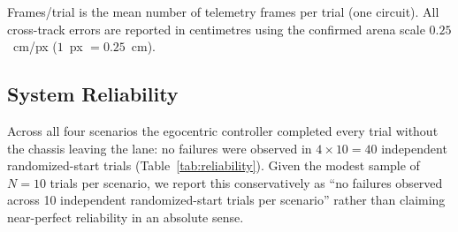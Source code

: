 \begin{table}[H]
\centering
\caption{Kinematic Performance Summary of the Final Egocentric Model, pooled over $N=10$ independent randomized-start trials per scenario.}
\label{tab:4.2}
\footnotesize
{}

\vspace{2pt}
{\footnotesize Frames/trial is the mean number of telemetry frames per trial (one circuit). All cross-track errors are reported in centimetres using the confirmed arena scale $0.25$~cm/px ($1$~px $= 0.25$~cm).}
\end{table}



\FloatBarrier

\subsection{System Reliability}
Across all four scenarios the egocentric controller completed every trial without the chassis
leaving the lane: no failures were observed in $4 \times 10 = 40$ independent randomized-start
trials (Table~\ref{tab:reliability}). Given the modest sample of $N=10$ trials per scenario, we
report this conservatively as ``no failures observed across 10 independent randomized-start trials
per scenario'' rather than claiming near-perfect reliability in an absolute sense.

